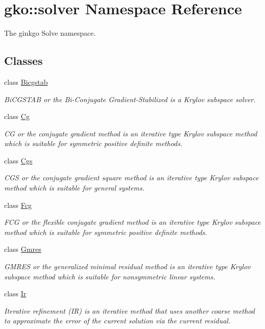 \hypertarget{namespacegko_1_1solver}{}\section{gko\+:\+:solver Namespace Reference}
\label{namespacegko_1_1solver}


The ginkgo Solve namespace.  


\subsection*{Classes}
\begin{DoxyCompactItemize}
\item 
class \hyperlink{classgko_1_1solver_1_1Bicgstab}{Bicgstab}
\begin{DoxyCompactList}\small\item\em Bi\+C\+G\+S\+T\+AB or the Bi-\/\+Conjugate Gradient-\/\+Stabilized is a Krylov subspace solver. \end{DoxyCompactList}\item 
class \hyperlink{classgko_1_1solver_1_1Cg}{Cg}
\begin{DoxyCompactList}\small\item\em CG or the conjugate gradient method is an iterative type Krylov subspace method which is suitable for symmetric positive definite methods. \end{DoxyCompactList}\item 
class \hyperlink{classgko_1_1solver_1_1Cgs}{Cgs}
\begin{DoxyCompactList}\small\item\em C\+GS or the conjugate gradient square method is an iterative type Krylov subspace method which is suitable for general systems. \end{DoxyCompactList}\item 
class \hyperlink{classgko_1_1solver_1_1Fcg}{Fcg}
\begin{DoxyCompactList}\small\item\em F\+CG or the flexible conjugate gradient method is an iterative type Krylov subspace method which is suitable for symmetric positive definite methods. \end{DoxyCompactList}\item 
class \hyperlink{classgko_1_1solver_1_1Gmres}{Gmres}
\begin{DoxyCompactList}\small\item\em G\+M\+R\+ES or the generalized minimal residual method is an iterative type Krylov subspace method which is suitable for nonsymmetric linear systems. \end{DoxyCompactList}\item 
class \hyperlink{classgko_1_1solver_1_1Ir}{Ir}
\begin{DoxyCompactList}\small\item\em Iterative refinement (IR) is an iterative method that uses another coarse method to approximate the error of the current solution via the current residual. \end{DoxyCompactList}\end{DoxyCompactItemize}
